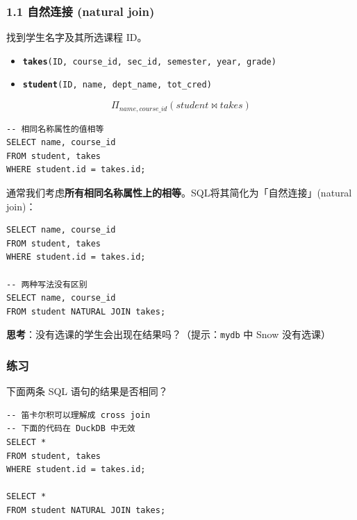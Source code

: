 \documentclass[aspectratio=169, 14pt]{beamer}
\begin{document}
\begin{frame}[fragile]
	\frametitle{1.1 自然连接 (natural join)}
	找到学生名字及其所选课程 ID。

	\begin{itemize}
		\item \texttt{\textbf{takes}(ID, course\_id, sec\_id, semester, year, grade)}
		\item  \texttt{\textbf{student}(ID, name, dept\_name, tot\_cred)}
	\end{itemize}
	\[\Pi_{name, course\_id}(student \Join takes)\]

	\pause
	\begin{verbatim}
-- 相同名称属性的值相等
SELECT name, course_id
FROM student, takes
WHERE student.id = takes.id;
\end{verbatim}

\end{frame}

\begin{frame}[fragile]
	通常我们考虑\textbf{所有相同名称属性上的相等}。SQL将其简化为「自然连接」(natural join)：

	\begin{verbatim}
SELECT name, course_id
FROM student, takes
WHERE student.id = takes.id;

-- 两种写法没有区别
SELECT name, course_id
FROM student NATURAL JOIN takes;
    \end{verbatim}

	\pause
	{\large {}} \textbf{思考}：没有选课的学生会出现在结果吗？（提示：\texttt{mydb} 中 Snow 没有选课）
\end{frame}

\begin{frame}[fragile]
	\frametitle{练习}

	{\large {}} 下面两条 SQL 语句的结果是否相同？

	\begin{verbatim}
-- 笛卡尔积可以理解成 cross join
-- 下面的代码在 DuckDB 中无效
SELECT *
FROM student, takes
WHERE student.id = takes.id;

SELECT *
FROM student NATURAL JOIN takes;
\end{verbatim}

	\pause
\end{frame}
\end{document}

